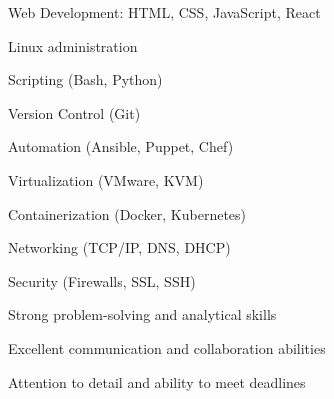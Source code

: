\begin{cventries}
  \cventry
    { } %
    { } %
    { } %
    { } %
    {
      \begin{cvitems} %
        \item {Web Development: HTML, CSS, JavaScript, React}
        \item {Linux administration}
        \item {Scripting (Bash, Python)}
        \item {Version Control (Git)}
        \item {Automation (Ansible, Puppet, Chef)}
        \item {Virtualization (VMware, KVM)}
        \item {Containerization (Docker, Kubernetes)}
        \item {Networking (TCP/IP, DNS, DHCP)}
        \item {Security (Firewalls, SSL, SSH)}
        \item {Strong problem-solving and analytical skills}
        \item {Excellent communication and collaboration abilities}
        \item {Attention to detail and ability to meet deadlines}
      \end{cvitems}
    }

\end{cventries}
